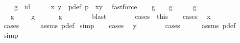 \begin{isabellebody}
\ \ \ {\isachardoublequoteopen}g\ {\isacharequal}\ id{\isachardoublequoteclose}\isanewline
%
\isadelimproof
%
\endisadelimproof
%
\isatagproof
{}\isamarkupfalse%
\ {\isacharminus}\isanewline
\ \ \isamarkupfalse%
\ x\ y\ \ p{\isacharunderscore}def{\isacharcolon}\ {\isachardoublequoteopen}p\ {\isacharequal}\ {\isacharparenleft}x{\isacharcomma}y{\isacharparenright}{\isachardoublequoteclose}\ \isamarkupfalse%
\ fastforce\isanewline
\ \ \isacommand{{\isacharbraceleft}}\isamarkupfalse%
\isamarkupfalse%
\ {\isachardoublequoteopen}g\ {\isacharequal}\ {\isasymrho}\ {\isasymor}\ g\ {\isacharequal}\ {\isasymrho}\ {\isasymcirc}\ {\isasymrho}\ {\isasymor}\ g\ {\isacharequal}\ {\isasymrho}\ {\isasymcirc}\ {\isasymrho}\ {\isasymcirc}\ {\isasymrho}{\isachardoublequoteclose}\isanewline
\ \ \isamarkupfalse%
\ \isamarkupfalse%
\ {\isacharparenleft}{}{\isacharparenright}\ {\isachardoublequoteopen}g\ {\isacharequal}\ {\isasymrho}{\isachardoublequoteclose}\ {\isacharbar}\ {\isacharparenleft}{}{\isacharparenright}\ {\isachardoublequoteopen}g\ {\isacharequal}\ {\isasymrho}\ {\isasymcirc}\ {\isasymrho}{\isachardoublequoteclose}\ {\isacharbar}\ {\isacharparenleft}{}{\isacharparenright}\ {\isachardoublequoteopen}g\ {\isacharequal}\ {\isasymrho}\ {\isasymcirc}\ {\isasymrho}\ {\isasymcirc}\ {\isasymrho}{\isachardoublequoteclose}\ \isamarkupfalse%
\ blast\ \ \ \ \isanewline
\ \ \isamarkupfalse%
\ cases\ {\isacharequal}\ this\isanewline
\ \ \isamarkupfalse%
\ cases\ \isamarkupfalse%
\ {\isachardoublequoteopen}x\ {\isacharequal}\ {}{\isachardoublequoteclose}\ \isanewline
\ \ \ \ \isamarkupfalse%
{\isacharparenleft}cases{\isacharparenright}\isanewline
\ \ \ \ \isamarkupfalse%
\ assms{\isacharparenleft}{}{\isacharparenright}\ p{\isacharunderscore}def\ \isamarkupfalse%
{\isacharparenleft}simp{\isacharparenright}{\isacharplus}\isanewline
\ \ \isamarkupfalse%
\ cases\ \isamarkupfalse%
\ {\isachardoublequoteopen}y\ {\isacharequal}\ {}{\isachardoublequoteclose}\ \isanewline
\ \ \ \ \isamarkupfalse%
{\isacharparenleft}cases{\isacharparenright}\isanewline
\ \ \ \ \isamarkupfalse%
\ assms{\isacharparenleft}{}{\isacharparenright}\ p{\isacharunderscore}def\ \isamarkupfalse%
{\isacharparenleft}simp{\isacharparenright}{\isacharplus}\isanewline

\end{isabellebody}
